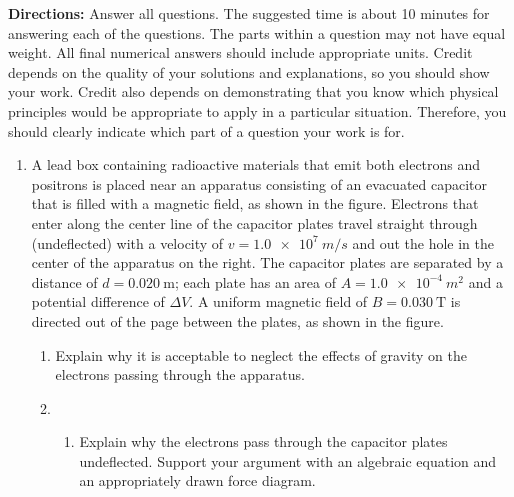 \documentclass[11pt]{article}
\begin{document}
\textbf{Directions:} Answer all questions. The suggested time is about 10
minutes for answering each of the questions. The parts within a question may
not have equal weight. All final numerical answers should include appropriate
units. Credit depends on the quality of your solutions and explanations, so you
should show your work. Credit also depends on demonstrating that you know which
physical principles would be appropriate to apply in a particular situation.
Therefore, you should clearly indicate which part of a question your work is
for.

\begin{enumerate}[leftmargin=15pt]

\item A lead box containing radioactive materials that emit both electrons and
  positrons is placed near an apparatus consisting of an evacuated capacitor
  that is filled with a magnetic field, as shown in the figure. Electrons that
  enter along the center line of the capacitor plates travel straight through
  (undeflected) with a velocity of $v=\SI{1.0e7}{m/s}$ and out
  the hole in the center of the apparatus on the right. The capacitor plates
  are separated by a distance of $d=\SI{0.020}{\metre}$; each plate has an area
  of $A=\SI{1.0e-4}{m^2}$ and a potential difference of $\Delta V$. A uniform
  magnetic field of $B=\SI{0.030}{\tesla}$ is directed out of the page between
  the plates, as shown in the figure.

  \vspace{-.2in}
  \begin{center}
  \end{center}

  \begin{enumerate}[noitemsep]
  \item\vspace{-.2in} Explain why it is acceptable to neglect the effects of
    gravity on the electrons passing through the apparatus.
  \item
    \begin{enumerate}
    \item Explain why the electrons pass through the capacitor plates
      undeflected. Support your argument with an algebraic equation
      and an appropriately drawn force diagram.


\end{enumerate}
\end{enumerate}
\end{enumerate}
\end{document}
